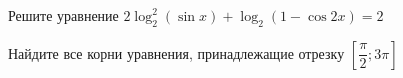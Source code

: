 \begin{ex}
	\begin{condition}
		\begin{enumcols}[label=\asbuk*)]
			\item Решите уравнение \( 2\log_2^2 (\sin x )+\log_2 (1  - \cos 2x)  = 2 \)
			\item Найдите все корни уравнения, принадлежащие отрезку \( \left[\dfrac{\pi}{2};3\pi\right] \)
		\end{enumcols}
	\end{condition}
\end{ex}